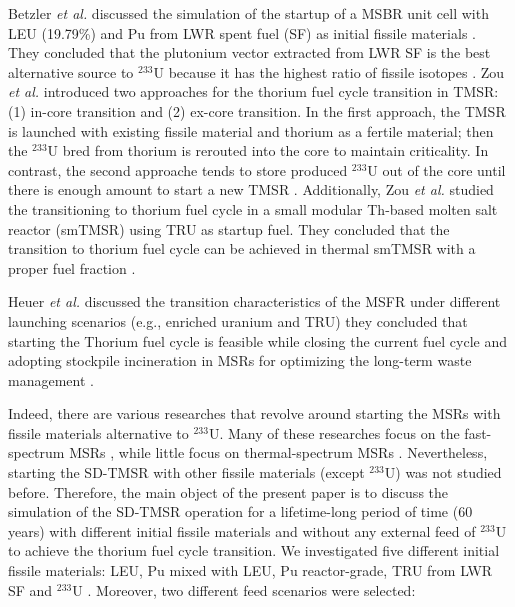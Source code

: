 Betzler \emph{et al.} discussed the simulation of the startup of a MSBR unit
cell with \gls{LEU} (19.79\%) and Pu from \gls{LWR} spent fuel (SF) as initial
fissile materials \cite{betzler2016modeling}. They concluded that the 
plutonium vector extracted from LWR SF is the best alternative source to 
$^{233}$U because it has the highest ratio of fissile isotopes
\cite{betzler2016modeling}. Zou \emph{et al.} introduced two approaches for
the thorium fuel cycle transition in \gls{TMSR}: (1) in-core transition and 
(2) ex-core transition. In the first approach, the TMSR is launched with 
existing fissile material and thorium as a fertile material; then the 
$^{233}$U bred from thorium is rerouted into the core to maintain criticality. 
In contrast, the second approache tends to store produced $^{233}$U out of the 
core until there is enough amount to start a new TMSR \cite{zou2018transition}.
Additionally, Zou \emph{et al.} studied the transitioning to thorium fuel
cycle in a small modular Th-based molten salt reactor (smTMSR) using \gls{TRU}
as startup fuel. They concluded that the transition to thorium fuel cycle can
be achieved in thermal smTMSR with a proper fuel fraction 
\cite{zou2018preliminary}.

Heuer \emph{et al.} discussed the transition characteristics of the \gls{MSFR}
under different launching scenarios (e.g., enriched uranium and TRU) they concluded that starting the Thorium fuel cycle is feasible while closing the current fuel cycle and adopting stockpile incineration in MSRs for optimizing the long-term waste management \cite{heuer2014towards}.

Indeed, there are various researches that revolve around starting the
\glspl{MSR} with fissile materials alternative to $^{233}$U. Many of these
researches focus on the fast-spectrum \glspl{MSR} \cite{ashraf2019modeling,
ashraf2018nuclear, rykhlevskii_fuel_2019, betzler_impacts_2019,
heuer2014towards,fiorina2013investigation}, while little focus on
thermal-spectrum \glspl{MSR} \cite{betzler2016modeling, zou2018preliminary,
zou2018transition}. Nevertheless, starting the \gls{SD-TMSR} with other
fissile materials (except $^{233}$U) was not studied before. Therefore,
the main object of the present paper is to discuss the simulation of the
\gls{SD-TMSR} operation for a lifetime-long period of time (60 years) with
different initial fissile materials and without any external feed of $^{233}$U
to achieve the thorium fuel cycle transition. We investigated five different
initial fissile materials: \gls{LEU}, Pu mixed with \gls{LEU}, Pu reactor-grade, \gls{TRU} from LWR SF and $^{233}$U \cite{de2000scenarios}. Moreover, two different feed scenarios were selected:

